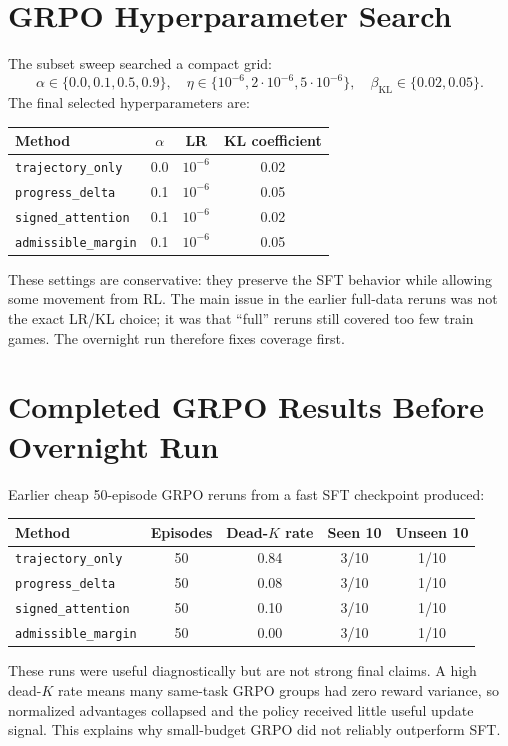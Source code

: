 \documentclass[10pt]{article}
\newcommand{\method}[1]{\texttt{#1}}
\begin{document}
\section{GRPO Hyperparameter Search}
The subset sweep searched a compact grid:
\[
\alpha \in \{0.0,0.1,0.5,0.9\},\quad
\eta \in \{10^{-6},2\cdot10^{-6},5\cdot10^{-6}\},\quad
\beta_{\mathrm{KL}}\in\{0.02,0.05\}.
\]
The final selected hyperparameters are:
\begin{center}
\begin{tabular}{lccc}
\toprule
Method & \(\alpha\) & LR & KL coefficient \\
\midrule
\method{trajectory\_only} & 0.0 & \(10^{-6}\) & 0.02 \\
\method{progress\_delta} & 0.1 & \(10^{-6}\) & 0.05 \\
\method{signed\_attention} & 0.1 & \(10^{-6}\) & 0.02 \\
\method{admissible\_margin} & 0.1 & \(10^{-6}\) & 0.05 \\
\bottomrule
\end{tabular}
\end{center}

These settings are conservative: they preserve the SFT behavior while allowing some movement from RL. The main issue in the earlier full-data reruns was not the exact LR/KL choice; it was that ``full'' reruns still covered too few train games. The overnight run therefore fixes coverage first.

\section{Completed GRPO Results Before Overnight Run}
Earlier cheap 50-episode GRPO reruns from a fast SFT checkpoint produced:
\begin{center}
\begin{tabular}{lcccc}
\toprule
Method & Episodes & Dead-\(K\) rate & Seen 10 & Unseen 10 \\
\midrule
\method{trajectory\_only} & 50 & 0.84 & 3/10 & 1/10 \\
\method{progress\_delta} & 50 & 0.08 & 3/10 & 1/10 \\
\method{signed\_attention} & 50 & 0.10 & 3/10 & 1/10 \\
\method{admissible\_margin} & 50 & 0.00 & 3/10 & 1/10 \\
\bottomrule
\end{tabular}
\end{center}

These runs were useful diagnostically but are not strong final claims. A high dead-\(K\) rate means many same-task GRPO groups had zero reward variance, so normalized advantages collapsed and the policy received little useful update signal. This explains why small-budget GRPO did not reliably outperform SFT.
\end{document}
